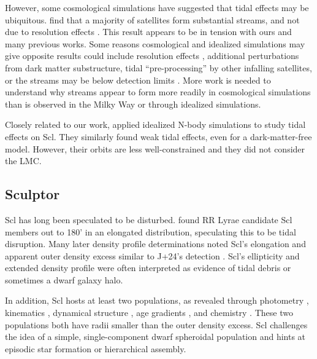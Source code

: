 However, some cosmological simulations have suggested that tidal effects
may be ubiquitous. \citep{riley+2024, shipp+2023} find that a majority
of satellites form substantial streams, and not due to resolution
effects \citep[see also][]{panithanpaisal+2021}. This result appears to
be in tension with ours and many previous works. Some reasons
cosmological and idealized simulations may give opposite results could
include resolution effects \citep[e.g.,][]{santos-santos+2025},
additional perturbations from dark matter substructure, tidal
``pre-processing'' by other infalling satellites, or the streams may be
below detection limits \citep[e.g.,][]{shipp+2023}. More work is needed
to understand why streams appear to form more readily in cosmological
simulations than is observed in the Milky Way or through idealized
simulations.

Closely related to our work, \citet{iorio+2019} applied idealized N-body
simulations to study tidal effects on Scl. They similarly found weak
tidal effects, even for a dark-matter-free model. However, their orbits
are less well-constrained and they did not consider the LMC.

\subsection{Sculptor}\label{sculptor}

Scl has long been speculated to be disturbed. \citet{innanen+papp1979}
found RR Lyrae candidate Scl members \citep[from][]{vanagt1978} out to
180' in an elongated distribution, speculating this to be tidal
disruption. Many later density profile determinations noted Scl's
elongation and apparent outer density excess similar to J+24's detection
\citep[but see also
\citet{coleman+dacosta+bland-hawthorn2005}]{eskridge1988, IH1995, walcher+2003, westfall+2006}.
Scl's ellipticity and extended density profile were often interpreted as
evidence of tidal debris or sometimes a dwarf galaxy halo.

In addition, Scl hosts at least two populations, as revealed through
photometry \citep{tolstoy+2004}, kinematics
\citep{battaglia+2008, tolstoy+2023, arroyo-polonio+2024}, dynamical
structure \citep{breddels+helmi2014}, age gradients \citep{deboer+2011},
and chemistry \citep{kirby+2009}. These two populations both have radii
smaller than the outer density excess. Scl challenges the idea of a
simple, single-component dwarf spheroidal population and hints at
episodic star formation or hierarchical assembly.

